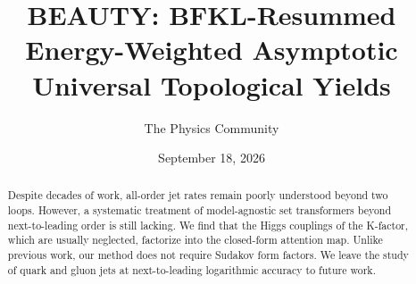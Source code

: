 \documentclass[11pt]{article}
\title{BEAUTY: BFKL-Resummed Energy-Weighted Asymptotic Universal Topological Yields}
\author{The Physics Community}
\date{September 18, 2026}
\numberwithin{equation}{section}
\theoremstyle{definition}
\theoremstyle{remark}
\begin{document}
\maketitle
\begin{abstract}
Despite decades of work, all-order jet rates remain poorly understood
beyond two loops. However, a systematic treatment of model-agnostic set
transformers beyond next-to-leading order is still lacking. We find that
the Higgs couplings of the K-factor, which are usually neglected,
factorize into the closed-form attention map. Unlike previous work, our
method does not require Sudakov form factors. We leave the study of
quark and gluon jets at next-to-leading logarithmic accuracy to future
work.
\end{abstract}
\tableofcontents





\nocite{*}


\end{document}
